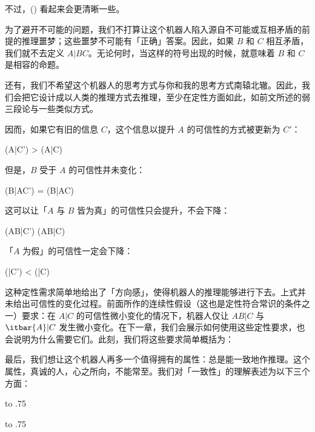 不过，(\in[1-32]) 看起来会更清晰一些。

为了避开不可能的问题，我们不打算让这个机器人陷入源自不可能或互相矛盾的前提的推理噩梦；这些噩梦不可能有「正确」答案。因此，如果 $B$ 和 $C$ 相互矛盾，我们就不去定义 $A|BC$。无论何时，当这样的符号出现的时候，就意味着 $B$ 和 $C$ 是相容的命题。

还有，我们不希望这个机器人的思考方式与你和我的思考方式南辕北辙。因此，我们会把它设计成以人类的推理方式去推理，至少在定性方面如此，如前文所述的弱三段论与一些类似方式。

因而，如果它有旧的信息 $C$，这个信息以提升 $A$ 的可信性的方式被更新为 $C'$：

\placeformula
\startformula
(A|C') > (A|C)
\stopformula

但是，$B$ 受于 $A$ 的可信性并未变化：

\placeformula
\startformula
(B|AC') = (B|AC)
\stopformula

这可以让「$A$ 与 $B$ 皆为真」的可信性只会提升，不会下降：

\placeformula
\startformula
(AB|C') \ge (AB|C)
\stopformula

「$A$ 为假」的可信性一定会下降：

\placeformula
\startformula
(|C') < (|C)
\stopformula

这种定性需求简单地给出了「方向感」，使得机器人的推理能够进行下去。上式并未给出可信性的变化过程。前面所作的连续性假设（这也是定性符合常识的条件之一）要求：在 $A|C$ 的可信性微小变化的情况下，机器人仅让 $AB|C$ 与 $\itbar{A}|C$ 发生微小变化。在下一章，我们会展示如何使用这些定性要求，也会说明为什么需要它们。此刻，我们将这些要求简单概括为：

\placeformula[desiderata-2]
\startformula
{}\quad{}
\stopformula

最后，我们想让这个机器人再多一个值得拥有的属性：总是能一致地作推理。这个属性，真诚的人，心之所向，不能常至。我们对「一致性」的理解表述为以下三个方面：


\startsubformulas[desiderata-3a]
\placeformula
\startformula
{}\quad\quad\hbox to .75
\stopformula

\placeformula[desiderata-3b]
\startformula
{}\quad\quad\hbox to .75
\stopformula

